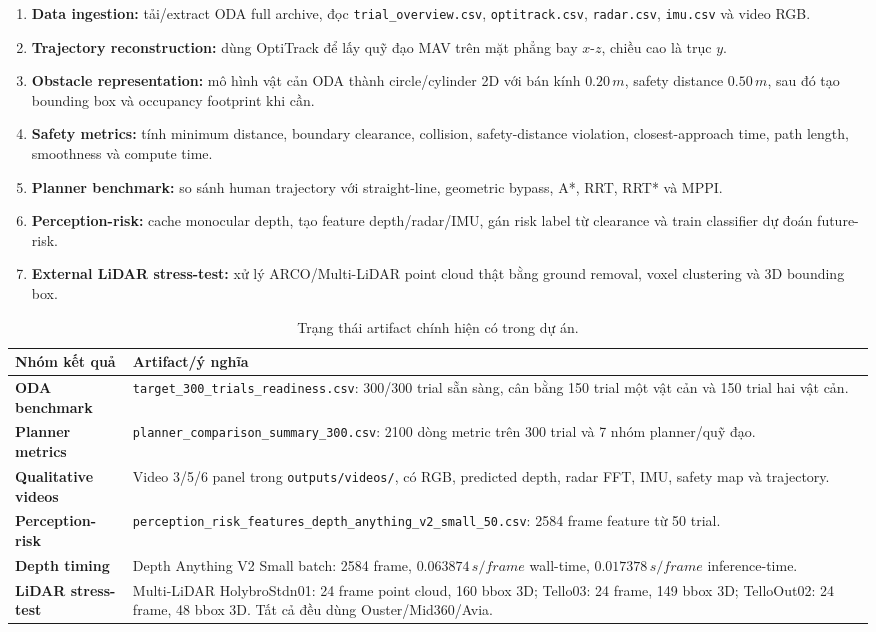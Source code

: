 \documentclass[10pt,a4paper]{article}
\newcommand{\code}[1]{\texttt{#1}}
\begin{document}
\begin{enumerate}
  \item \textbf{Data ingestion:} tải/extract ODA full archive, đọc \code{trial\_overview.csv}, \code{optitrack.csv}, \code{radar.csv}, \code{imu.csv} và video RGB.
  \item \textbf{Trajectory reconstruction:} dùng OptiTrack để lấy quỹ đạo MAV trên mặt phẳng bay \(x\)-\(z\), chiều cao là trục \(y\).
  \item \textbf{Obstacle representation:} mô hình vật cản ODA thành circle/cylinder 2D với bán kính \(0.20\,m\), safety distance \(0.50\,m\), sau đó tạo bounding box và occupancy footprint khi cần.
  \item \textbf{Safety metrics:} tính minimum distance, boundary clearance, collision, safety-distance violation, closest-approach time, path length, smoothness và compute time.
  \item \textbf{Planner benchmark:} so sánh human trajectory với straight-line, geometric bypass, A*, RRT, RRT* và MPPI.
  \item \textbf{Perception-risk:} cache monocular depth, tạo feature depth/radar/IMU, gán risk label từ clearance và train classifier dự đoán future-risk.
  \item \textbf{External LiDAR stress-test:} xử lý ARCO/Multi-LiDAR point cloud thật bằng ground removal, voxel clustering và 3D bounding box.
\end{enumerate}

\begin{table}[H]
\centering
\small
\caption{Trạng thái artifact chính hiện có trong dự án.}
\begin{tabularx}{0.96\linewidth}{>{\bfseries}p{3.5cm} X}
\toprule
Nhóm kết quả & Artifact/ý nghĩa \\
\midrule
ODA benchmark & \code{target\_300\_trials\_readiness.csv}: 300/300 trial sẵn sàng, cân bằng 150 trial một vật cản và 150 trial hai vật cản. \\
Planner metrics & \code{planner\_comparison\_summary\_300.csv}: 2100 dòng metric trên 300 trial và 7 nhóm planner/quỹ đạo. \\
Qualitative videos & Video 3/5/6 panel trong \code{outputs/videos/}, có RGB, predicted depth, radar FFT, IMU, safety map và trajectory. \\
Perception-risk & \code{perception\_risk\_features\_depth\_anything\_v2\_small\_50.csv}: 2584 frame feature từ 50 trial. \\
Depth timing & Depth Anything V2 Small batch: 2584 frame, \(0.063874\,s/frame\) wall-time, \(0.017378\,s/frame\) inference-time. \\
LiDAR stress-test & Multi-LiDAR HolybroStdn01: 24 frame point cloud, 160 bbox 3D; Tello03: 24 frame, 149 bbox 3D; TelloOut02: 24 frame, 48 bbox 3D. Tất cả đều dùng Ouster/Mid360/Avia. \\
\bottomrule
\end{tabularx}
\end{table}
\end{document}
